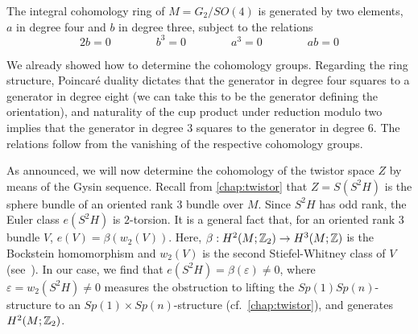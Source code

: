 \begin{prop}
	The integral cohomology ring of $M=G_2/SO(4)$ is generated by two elements, $a$ in degree four and $b$ in degree three, subject to the relations
	\begin{equation*}
		2b=0 \qquad \qquad b^3=0 \qquad \qquad a^3=0 \qquad \qquad ab=0
	\end{equation*}
\end{prop}

\begin{myproof}
	We already showed how to determine the cohomology groups. Regarding the ring structure, Poincar\'e duality dictates that the generator in degree four squares to a generator in degree eight (we can take this to be the generator defining the orientation), and naturality of the cup product under reduction modulo two implies that the generator in degree $3$ squares to the generator in degree $6$. The relations follow from the vanishing of the respective cohomology groups.
\end{myproof}


As announced, we will now determine the cohomology of the twistor space $Z$ by means of the Gysin sequence. Recall from \cref{chap:twistor} that $Z=S(S^2H)$ is the sphere bundle of an oriented rank $3$ bundle over $M$. Since $S^2H$ has odd rank, the Euler class $e(S^2H)$ is $2$-torsion. It is a general fact that, for an oriented rank $3$ bundle $V$, $e(V)=\beta(w_2(V))$. Here, $\beta: H^2(M;\mathbb{Z}_2)\to H^3(M;\mathbb{Z})$ is the Bockstein homomorphism and $w_2(V)$ is the second Stiefel-Whitney class of $V$ (see~\cite[79]{BCM2013}).
In our case, we find that $e(S^2H)=\beta(\varepsilon)\neq 0$, where $\varepsilon=w_2(S^2H)\neq 0$ measures the obstruction to lifting the $Sp(1)Sp(n)$-structure to an $Sp(1)\times Sp(n)$-structure (cf.~\cref{chap:twistor}), and generates $H^2(M;\mathbb{Z}_2)$.

